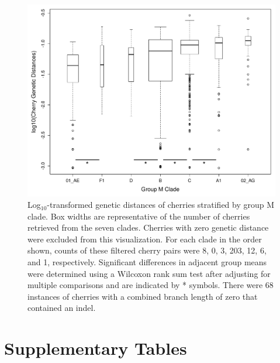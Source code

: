 \documentclass[12pt]{article}
\begin{document}
\begin{figure}[htbp]
    \centering
    \includegraphics[width=.95\textwidth, trim={3mm, 0mm, 0mm, 0mm}, clip]{boxplot_logGD.pdf}
    \caption{ Log$_{10}$-transformed genetic distances of cherries stratified by group M clade. 
    Box widths are representative of the number of cherries retrieved from the seven clades. 
    Cherries with zero genetic distance were excluded from this visualization. 
    For each clade in the order shown, counts of these filtered cherry pairs were 8, 0, 3, 203, 12, 6, and 1, respectively. 
    Significant differences in adjacent group means were determined using a Wilcoxon rank sum test after adjusting for multiple comparisons and are indicated by * symbols. There were 68 instances of cherries with a combined branch length of zero that contained an indel. }
    \label{boxplot_GD}
\end{figure}

\clearpage

\section * {Supplementary Tables}
\end{document}
